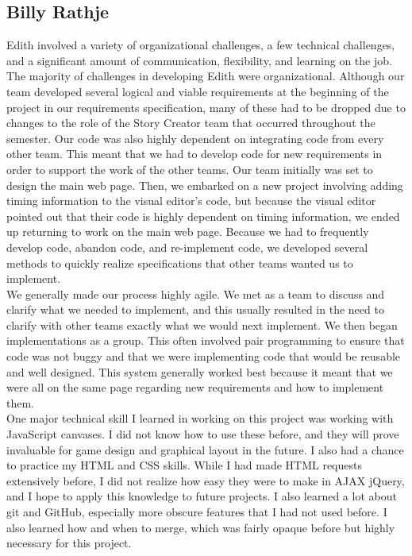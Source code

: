 \documentclass[12pt]{article}
\begin{document}
\subsection{Billy Rathje}

Edith involved a variety of organizational challenges, a few technical challenges, and a significant amount of communication, flexibility, and learning on the job. \\ 

The majority of challenges in developing Edith were organizational. Although our team developed several logical and viable requirements at the beginning of the project in our requirements specification, many of these had to be dropped due to changes to the role of the Story Creator team that occurred throughout the semester. Our code was also highly dependent on integrating code from every other team. This meant that we had to develop code for new requirements in order to support the work of the other teams. Our team initially was set to design the main web page. Then, we embarked on a new project involving adding timing information to the visual editor's code, but because the visual editor pointed out that their code is highly dependent on timing information, we ended up returning to work on the main web page. Because we had to frequently develop code, abandon code, and re-implement code, we developed several methods to quickly realize specifications that other teams wanted us to implement. \\

We generally made our process highly agile. We met as a team to discuss and clarify what we needed to implement, and this usually resulted in the need to clarify with other teams exactly what we would next implement. We then began implementations as a group. This often involved pair programming to ensure that code was not buggy and that we were implementing code that would be reusable and well designed. This system generally worked best because it meant that we were all on the same page regarding new requirements and how to implement them. \\

One major technical skill I learned in working on this project was working with JavaScript canvases. I did not know how to use these before, and they will prove invaluable for game design and graphical layout in the future. I also had a chance to practice my HTML and CSS skills. While I had made HTML requests extensively before, I did not realize how easy they were to make in AJAX jQuery, and I hope to apply this knowledge to future projects. I also learned a lot about git and GitHub, especially more obscure features that I had not used before. I also learned how and when to merge, which was fairly opaque before but highly necessary for this project. \\
\end{document}
